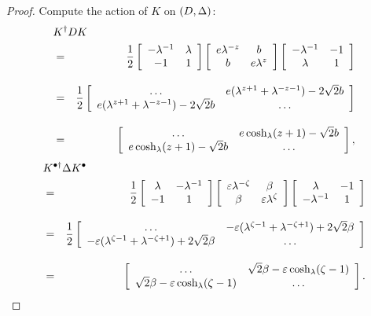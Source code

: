 \begin{proof}
Compute the action of $K$ on $(D,\Delta)$:
\begin{eqnarray}
\lefteqn{K^\dagger DK}\nonumber\\
& = & \frac{1}{2}
  \left[ \begin{array}{cc} 
  -\lambda^{-1} & \lambda  \\
  -1 & 1
  \end{array} \right]
  \left[ \begin{array}{cc} 
  e{\lambda^{-z}} & b \\
  b & e{\lambda^{z}}
  \end{array} \right]
  \left[ \begin{array}{cc} 
  -\lambda^{-1} & -1  \\
  \lambda & 1
  \end{array} \right] \nonumber \\[9pt]
& = & \frac{1}{2} 
  \left[ \begin{array}{cc} 
  \ldots & e(\lambda^{z+1}+\lambda^{-z-1})
    -2\sqrt{2}b \\
  e(\lambda^{z+1}+\lambda^{-z-1})-2\sqrt{2}b & \ldots
  \end{array} \right]  \nonumber \\[9pt]
& = & 
  \left[ \begin{array}{cc} 
  \ldots & e\cosl(z+1) -\sqrt{2}b \\
  e\cosl(z+1)  -\sqrt{2}b & \ldots
  \end{array} \right],\nonumber
\end{eqnarray}
\begin{eqnarray} 
\lefteqn{K^{\bullet\dagger} \Delta K^\bullet} 
\nonumber\\
& = & \frac{1}{2}
  \left[ \begin{array}{cc} 
  \lambda & -\lambda^{-1}  \\
  -1 & 1
  \end{array} \right]
  \left[ \begin{array}{cc} 
  \varepsilon{\lambda^{-\zeta}} & \beta \\
  \beta & \varepsilon{\lambda^{\zeta}}
  \end{array} \right]
  \left[ \begin{array}{cc} 
  \lambda & -1  \\
  -\lambda^{-1} & 1
  \end{array} \right] \nonumber \\[9pt]
& = & \frac{1}{2} 
  \left[ \begin{array}{cc} 
  \ldots & -\varepsilon(
    \lambda^{\zeta-1}+\lambda^{-\zeta+1})+2\sqrt{2}\beta \\
  -\varepsilon(\lambda^{\zeta-1}+\lambda^{-\zeta+1})
    +2\sqrt{2}\beta & \ldots
  \end{array} \right]  \nonumber \\[9pt]
& = &
  \left[ \begin{array}{cc} 
  \ldots & \sqrt{2}\beta - \varepsilon \cosl(\zeta-1) \\
  \sqrt{2}\beta - \varepsilon\cosl(\zeta-1)
    & \ldots
  \end{array} \right].\nonumber
\end{eqnarray}


\end{proof}
